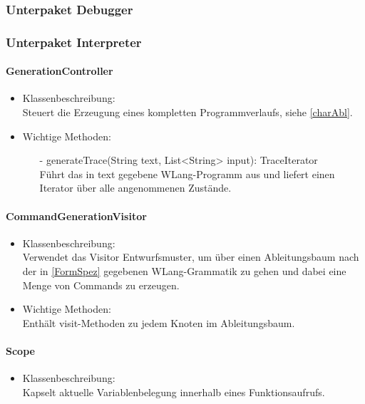 \documentclass[parskip=full]{scrartcl}
\begin{document}
\subsubsection{Unterpaket Debugger}
\subsubsection{Unterpaket Interpreter}
\paragraph{GenerationController}
\begin{itemize}
\item Klassenbeschreibung: \\
Steuert die Erzeugung eines kompletten Programmverlaufs, siehe \ref{charAbl}.
\item Wichtige Methoden:\\
\begin{itemize}
\item[-] generateTrace(String text, List<String> input): TraceIterator\\
Führt das in text gegebene WLang-Programm aus und liefert einen Iterator über alle angenommenen Zustände.
\end{itemize}
\end{itemize}

\paragraph{CommandGenerationVisitor}
\begin{itemize}
\item Klassenbeschreibung: \\
Verwendet das Visitor Entwurfsmuster, um über einen Ableitungsbaum nach der in \ref{FormSpez} gegebenen WLang-Grammatik zu gehen und dabei eine Menge von Commands zu erzeugen.
\item Wichtige Methoden:\\
Enthält visit-Methoden zu jedem Knoten im Ableitungsbaum.
\end{itemize}
\paragraph{Scope}
\begin{itemize}
\item Klassenbeschreibung: \\
Kapselt aktuelle Variablenbelegung innerhalb eines Funktionsaufrufs.
\end{itemize}
\end{document}
